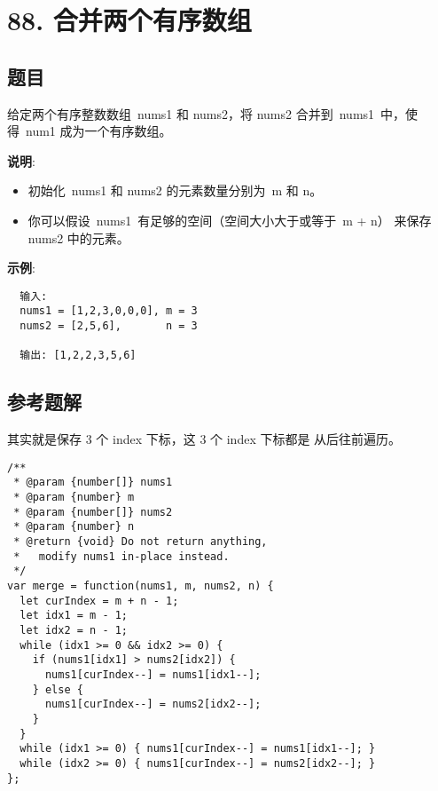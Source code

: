 \newpage
\section{88. 合并两个有序数组}
\label{leetcode:88}

\subsection{题目}

给定两个有序整数数组 nums1 和 nums2，将 nums2 合并到 nums1 中，使得 num1 成为一个有序数组。

\textbf{说明}:

\begin{itemize}
  \item 初始化 nums1 和 nums2 的元素数量分别为 m 和 n。
  \item 你可以假设 nums1 有足够的空间（空间大小大于或等于 m + n）
    来保存 nums2 中的元素。
\end{itemize}

\textbf{示例}:

\begin{verbatim}
  输入:
  nums1 = [1,2,3,0,0,0], m = 3
  nums2 = [2,5,6],       n = 3

  输出: [1,2,2,3,5,6]
\end{verbatim}

\subsection{参考题解}

其实就是保存 3 个 index 下标，这 3 个 index 下标都是
从后往前遍历。

\begin{verbatim}
/**
 * @param {number[]} nums1
 * @param {number} m
 * @param {number[]} nums2
 * @param {number} n
 * @return {void} Do not return anything, 
 *   modify nums1 in-place instead.
 */
var merge = function(nums1, m, nums2, n) {
  let curIndex = m + n - 1;
  let idx1 = m - 1;
  let idx2 = n - 1;
  while (idx1 >= 0 && idx2 >= 0) {
    if (nums1[idx1] > nums2[idx2]) {
      nums1[curIndex--] = nums1[idx1--];
    } else {
      nums1[curIndex--] = nums2[idx2--];
    }
  }
  while (idx1 >= 0) { nums1[curIndex--] = nums1[idx1--]; }
  while (idx2 >= 0) { nums1[curIndex--] = nums2[idx2--]; }
};
\end{verbatim}
